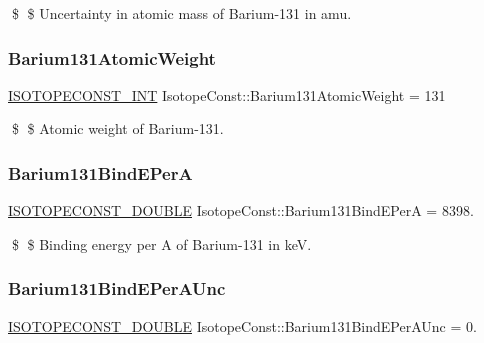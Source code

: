 \$ \$ Uncertainty in atomic mass of Barium-\/131 in amu. \mbox{\label{group___isotope_const-_barium-_ba131_gaa907e062b44f8d87604614bd0032ed35}} 
\subsubsection{\texorpdfstring{Barium131\+Atomic\+Weight}{Barium131AtomicWeight}}
{\footnotesize\ttfamily \mbox{\hyperlink{group___isotope_const-_macros_ga5f18360b3e99483a35c32d789e62621c}{I\+S\+O\+T\+O\+P\+E\+C\+O\+N\+S\+T\+\_\+\+I\+NT}} Isotope\+Const\+::\+Barium131\+Atomic\+Weight = 131}

\$ \$ Atomic weight of Barium-\/131. \mbox{\label{group___isotope_const-_barium-_ba131_ga42003ba91515acc3ea9ca3d57e4647c2}} 
\subsubsection{\texorpdfstring{Barium131\+Bind\+E\+PerA}{Barium131BindEPerA}}
{\footnotesize\ttfamily \mbox{\hyperlink{group___isotope_const-_macros_ga8f45a7272ce02c0b4c65c44636ed719a}{I\+S\+O\+T\+O\+P\+E\+C\+O\+N\+S\+T\+\_\+\+D\+O\+U\+B\+LE}} Isotope\+Const\+::\+Barium131\+Bind\+E\+PerA = 8398.}

\$ \$ Binding energy per A of Barium-\/131 in keV. \mbox{\label{group___isotope_const-_barium-_ba131_ga33546744cb69be48f0c45d634c8be0cb}} 
\subsubsection{\texorpdfstring{Barium131\+Bind\+E\+Per\+A\+Unc}{Barium131BindEPerAUnc}}
{\footnotesize\ttfamily \mbox{\hyperlink{group___isotope_const-_macros_ga8f45a7272ce02c0b4c65c44636ed719a}{I\+S\+O\+T\+O\+P\+E\+C\+O\+N\+S\+T\+\_\+\+D\+O\+U\+B\+LE}} Isotope\+Const\+::\+Barium131\+Bind\+E\+Per\+A\+Unc = 0.}

